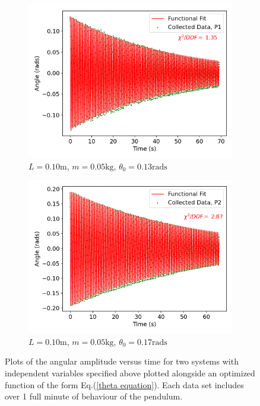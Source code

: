 \begin{figure}[H]
\centering
\begin{subfigure}[t]{0.5\textwidth}
  \centering
  \includegraphics[width=1\textwidth]{Plots/P1.png}
  \caption{\small{$L = 0.10\text{m}$, $m = 0.05\text{kg}$, $\theta_0 = 0.13\text{rads}$}}
  \label{P1}
\end{subfigure}%
\begin{subfigure}[t]{.5\textwidth}
  \centering
  \includegraphics[width=\textwidth]{Plots/P2.png}
  \caption{\small{$L = 0.10\text{m}$, $m = 0.05\text{kg}$, $\theta_0 = 0.17\text{rads}$}}
  \label{P2}
\end{subfigure}
\caption{\small{Plots of the angular amplitude versus time for two systems with independent variables specified above plotted alongside an optimized function of the form Eq.(\ref{theta equation}). Each data set includes over 1 full minute of behaviour of the pendulum.}}
\end{figure}

